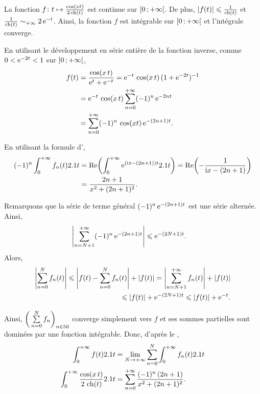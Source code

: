 \begin{elemsolution}
\begin{reponses}
\item La fonction $\fonctionligne[f]{t}{\frac{\cos(x t)}{2 \ch(t)}}$ est continue sur $\interfo{0}{+\infty}$. De plus, $\module{f(t)} \leqslant \frac{1}{\ch(t)}$ et $\frac{1}{\ch(t)} \sim_{+\infty} 2 \, \e^{-t}$. Ainsi, la fonction $f$ est intégrable sur $\interfo{0}{+\infty}$ et l'intégrale converge.

\item En utilisant le développement en série entière de la fonction inverse, comme $0 < \e^{-2t} < 1$ sur $\interoo{0}{+\infty}$, 
\begin{align*}
f(t)
&= \frac{\cos(x \, t)}{\e^t + \e^{-t}}
= \e^{-t} \, \cos(x \, t) \, (1 + \e^{-2t})^{-1}\\
&= \e^{-t} \, \cos(x \, t) \sum_{n=0}^{+\infty} (-1)^n \, \e^{-2 n t}\\
&= \sum_{n=0}^{+\infty} (-1)^n \, \cos(x t) \, \e^{- (2 n + 1) t}.
\end{align*}

\item En utilisant la formule d',
\begin{align*}
(-1)^n \int_0^{+\infty} f_n(t) \d t
&= \Reel\mathopen{}\left(\int_0^{+\infty} \e^{(\i x - (2 n + 1)) t} \d t\right) 
= \Reel\mathopen{}\left(-\frac{1}{\i x - (2 n + 1)}\right)\\
&= \frac{2 n + 1}{x^2 + (2 n + 1)^2}.
\end{align*}

\item Remarquons que la série de terme général $(-1)^n \, \e^{- (2 n + 1) t}$ est une série alternée. Ainsi,
\begin{align*}
\module{\sum_{n=N+1}^{+\infty} (-1)^n \, \e^{-(2 n + 1) t}}
&\leqslant \e^{-(2 N + 1) t}.
\end{align*}
Alors,
\begin{align*}
\module{\sum_{n=0}^N f_n(t)}
\leqslant \module{f(t) - \sum_{n=0}^N f_n(t)} + \module{f(t)}
= \module{\sum_{n=N+1}^{+\infty} f_n(t)} + \module{f(t)} \\
\leqslant |f(t)| + \e^{-(2N+1) t} 
\leqslant \module{f(t)} + \e^{-t}.
\end{align*}

Ainsi, $\bigg(\sum\limits_{n=0}^N f_n\bigg)_{n\in\N}$ converge simplement vers $f$ et ses sommes partielles sont dominées par une fonction intégrable. Donc, d'après le ,
\begin{align*}
\int_0^{+\infty} f(t) \d t
&= \lim_{N\to+\infty} \sum_{n=0}^N \int_0^{+\infty} f_n(t) \d t\\
\int_0^{+\infty} \frac{\cos(x \, t)}{2 \, \ch(t)} \d t
&= \sum_{n=0}^{+\infty} \frac{(-1)^n \, (2 n + 1)}{x^2 + (2 n + 1)^2}.
\end{align*}
\end{reponses}
\end{elemsolution}